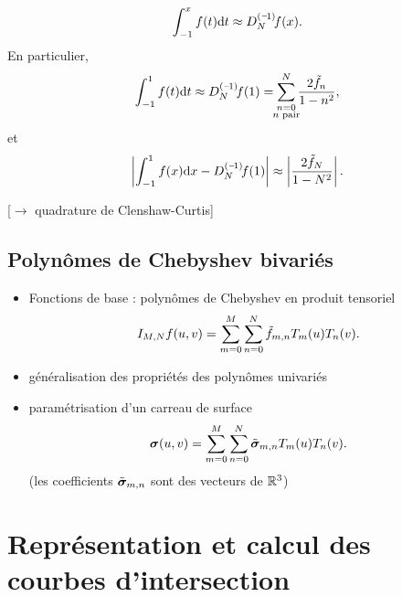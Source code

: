 \begin{equation}
	\int_{-1}^{x} f(t) \dx{t} 
	\approx \interpprim{f}{N}(x).
\end{equation}
En particulier,
\begin{equation}
	\int_{-1}^{1} f(t) \dx{t} 
	\approx 
	\interpprim{f}{N}(1)
	=
	\sum_{\mathclap{\substack{n = 0\\n \text{ pair}}}}^{N} \frac{2 \tilde{f}_n}{1 - n^2},
\end{equation}
et
\begin{equation}
	\left| \int_{-1}^{1} f(x) \dx{x} - \interpprim{f}{N}(1) \right|
	\approx
	\left|\frac{2 \tilde{f}_{N}}{1 - N^2}\right|.
\end{equation}

[$\to$ quadrature de Clenshaw-Curtis]








\subsection{Polynômes de Chebyshev bivariés}
\begin{itemize}
	\item Fonctions de base : polynômes de Chebyshev en produit tensoriel
	\[ \interpolant{f}{M,N}(u,v) = \sum_{m=0}^{M} \sum_{n=0}^{N} \tilde{f}_{m,n} T_m(u) T_n(v). \]
	\item généralisation des propriétés des polynômes univariés
	\item paramétrisation d'un carreau de surface
	\begin{equation}
		\bs(u,v) = \sum_{m=0}^{M} \sum_{n=0}^{N} \tilde{\bs}_{m,n} T_m(u) T_n(v).
	\end{equation}
	(les coefficients $\tilde{\bs}_{m,n}$ sont des vecteurs de $\reals^3$)
\end{itemize}

%

\section{Représentation et calcul des courbes d'intersection}
